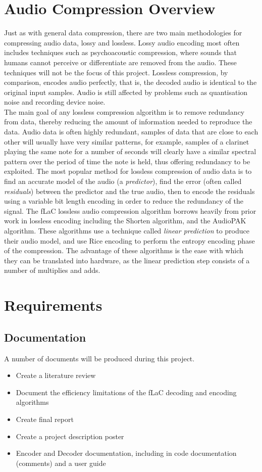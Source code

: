 \documentclass[12pt]{scrartcl}
\begin{document}
  \section{Audio Compression Overview}
  Just as with general data compression, there are two main methodologies for compressing audio data, lossy and lossless. Lossy audio encoding most often includes techniques such as psychoacoustic compression, where sounds that humans cannot perceive or differentiate are removed from the audio. These techniques will not be the focus of this project. Lossless compression, by comparison, encodes audio perfectly, that is, the decoded audio is identical to the original input samples. Audio is still affected by problems such as quantisation noise and recording device noise.\\
  The main goal of any lossless compression algorithm is to remove redundancy from data, thereby reducing the amount of information needed to reproduce the data. Audio data is often highly redundant, samples of data that are close to each other will usually have very similar patterns, for example, samples of a clarinet playing the same note for a number of seconds will clearly have a similar spectral pattern over the period of time the note is held, thus offering redundancy to be exploited. The most popular method for lossless compression of audio data is to find an accurate model of the audio (a \textit{predictor}), find the error (often called \textit{residuals}) between the predictor and the true audio, then to encode the residuals using a variable bit length encoding in order to reduce the redundancy of the signal. The fLaC lossless audio compression algorithm borrows heavily from prior  work in lossless encoding including the Shorten algorithm\cite{shorten}, and the AudioPAK algorithm\cite{audiopak}. These algorithms use a technique called \textit{linear prediction} to produce their audio model, and use Rice encoding to perform the entropy encoding phase of the compression. The advantage of these algorithms is the ease with which they can be translated into hardware, as the linear prediction step consists of a number of multiplies and adds.
  
  \section{Requirements}
  \subsection{Documentation}
  A number of documents will be produced during this project.
  \begin{itemize}
  \item Create a literature review
  \item Document the efficiency limitations of the fLaC decoding and encoding algorithms
  \item Create final report
  \item Create a project description poster
  \item Encoder and Decoder documentation, including in code documentation (comments) and a user guide
  \end{itemize}
  
\end{document}
